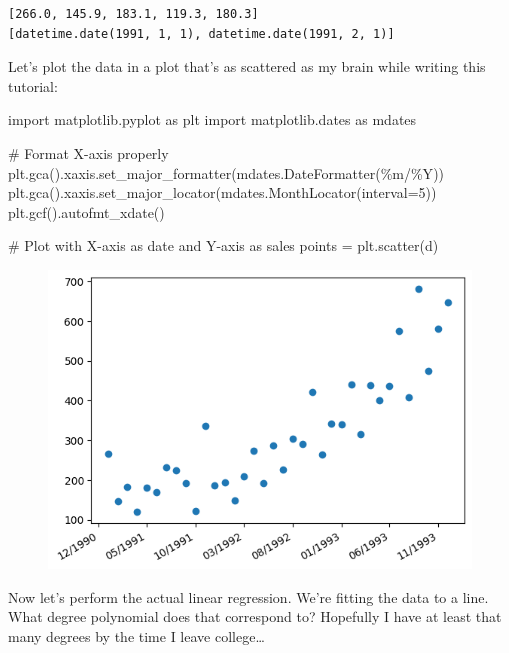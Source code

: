 \documentclass[
  letterpaper,
  DIV=11,
  numbers=noendperiod]{scrartcl}
\newenvironment{Shaded}{\begin{snugshade}}{\end{snugshade}}
\newcommand{\CommentTok}[1]{\textcolor[rgb]{0.37,0.37,0.37}{#1}}
\newcommand{\DecValTok}[1]{\textcolor[rgb]{0.68,0.00,0.00}{#1}}
\newcommand{\ImportTok}[1]{\textcolor[rgb]{0.00,0.46,0.62}{#1}}
\newcommand{\NormalTok}[1]{\textcolor[rgb]{0.00,0.23,0.31}{#1}}
\newcommand{\OperatorTok}[1]{\textcolor[rgb]{0.37,0.37,0.37}{#1}}
\newcommand{\StringTok}[1]{\textcolor[rgb]{0.13,0.47,0.30}{#1}}
\begin{document}
\begin{verbatim}
[266.0, 145.9, 183.1, 119.3, 180.3]
[datetime.date(1991, 1, 1), datetime.date(1991, 2, 1)]
\end{verbatim}

Let's plot the data in a plot that's as scattered as my brain while
writing this tutorial:

\begin{Shaded}
\begin{Highlighting}[]
\ImportTok{import}\NormalTok{ matplotlib.pyplot }\ImportTok{as}\NormalTok{ plt}
\ImportTok{import}\NormalTok{ matplotlib.dates }\ImportTok{as}\NormalTok{ mdates}

\CommentTok{\# Format X{-}axis properly}
\NormalTok{plt.gca().xaxis.set\_major\_formatter(mdates.DateFormatter(}\StringTok{\textquotesingle{}\%m/\%Y\textquotesingle{}}\NormalTok{))}
\NormalTok{plt.gca().xaxis.set\_major\_locator(mdates.MonthLocator(interval}\OperatorTok{=}\DecValTok{5}\NormalTok{))}
\NormalTok{plt.gcf().autofmt\_xdate()}

\CommentTok{\# Plot with X{-}axis as date and Y{-}axis as sales}
\NormalTok{points }\OperatorTok{=}\NormalTok{ plt.scatter(d)}
\end{Highlighting}
\end{Shaded}

\begin{figure}[H]

{\centering \includegraphics{00_core_files/figure-pdf/cell-3-output-1.png}

}

\end{figure}

Now let's perform the actual linear regression. We're fitting the data
to a line. What degree polynomial does that correspond to? Hopefully I
have at least that many degrees by the time I leave college\ldots{}
\end{document}
